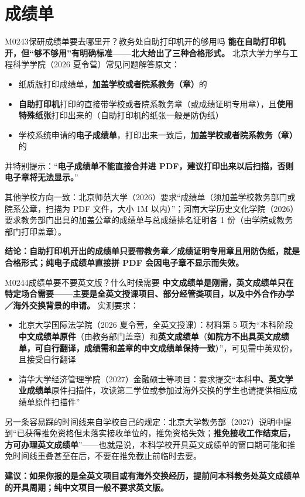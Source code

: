 \section{成绩单}
\begin{qa}{M0243}{保研成绩单要去哪里开？教务处自助打印机开的够用吗}
\textbf{能在自助打印机开，但“够不够用”有明确标准——北大给出了三种合格形式。} 北京大学力学与工程科学学院（2026 夏令营）常见问题解答原文：

\begin{itemize}
  \item 纸质版打印成绩单，\textbf{加盖学校或者院系教务（章）}的
  \item \textbf{自助打印机}打印的直接带学校或者院系教务章（或成绩证明专用章），且\textbf{使用特殊纸张}打印出来的（自助打印机的纸张一般是防伪纸）
  \item 学校系统申请的\textbf{电子成绩单}，打印出来一致后，\textbf{加盖学校或者院系教务（章）}的
\end{itemize}

并特别提示：“\textbf{电子成绩单不能直接合并进 PDF，建议打印出来以后扫描，否则电子章将无法显示。}”

其他学校方向一致：北京师范大学（2026）要求“成绩单（须加盖学校教务部门或院系公章，扫描为 PDF 文件，大小 1M 以内）”；河南大学历史文化学院（2026）要求教务部门出具的加盖公章的成绩单与总成绩排名证明各 1 份（由学院或教务部门打印盖章）。

\textbf{结论：自助打印机开出的成绩单只要带教务章／成绩证明专用章且用防伪纸，就是合格形式；纯电子成绩单直接拼 PDF 会因电子章不显示而失效。}
\end{qa}

\begin{qa}{M0244}{成绩单要不要英文版？什么时候需要}
\textbf{中文成绩单是刚需，英文成绩单只在特定场合需要——主要是全英文授课项目、部分经管类项目，以及中外合作办学／海外交换背景的申请。} 实测要求：

\begin{itemize}
  \item 北京大学国际法学院（2026 夏令营，全英文授课）：材料第 5 项为“本科阶段\textbf{中文成绩单原件}（由教务部门盖章）和\textbf{英文成绩单}（\textbf{如院方不出具英文成绩单，可自行翻译，成绩需和盖章的中文成绩单保持一致}）”，可见需中英双份，且接受自行翻译
  \item 清华大学经济管理学院（2027）金融硕士等项目：要求提交“本科\textbf{中、英文学业成绩单}原件扫描件，攻读第二学位或参加过海外交换的学生也请提供相应成绩单原件扫描件”
\end{itemize}

另一条容易踩的时间线来自学校自己的规定：北京大学教务部（2027）说明中提到“已获得推免资格但未落实接收单位的，推免资格失效；\textbf{推免接收工作结束后，方可办理英文成绩单}”——也就是说，本科学校开具英文成绩单的窗口期可能和推免时间线重叠甚至在后，不要在推免截止前临时去要。

\textbf{建议：如果你报的是全英文项目或有海外交换经历，提前问本科教务处英文成绩单的开具周期；纯中文项目一般不要求英文版。}
\end{qa}

